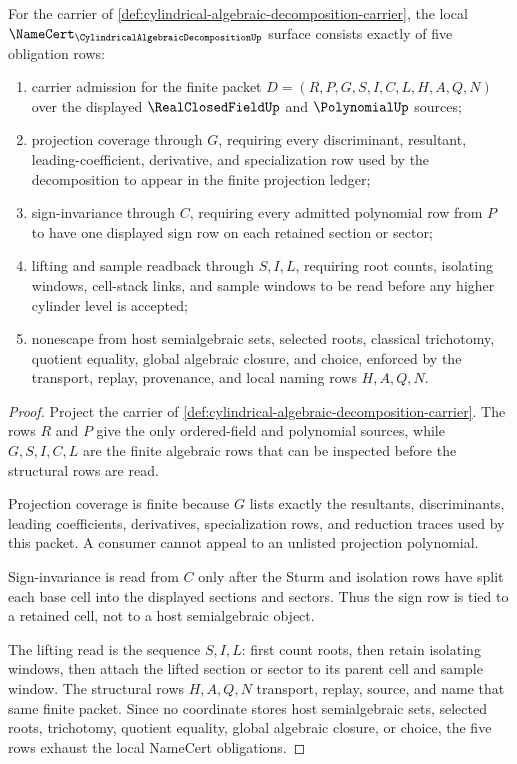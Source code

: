 \begin{theorem}
\label{thm:cylindrical-algebraic-decomposition-namecert-obligations}
For the carrier of \autoref{def:cylindrical-algebraic-decomposition-carrier}, the local $\NameCert_{\CylindricalAlgebraicDecompositionUp}$ surface consists exactly of five obligation rows:
\begin{enumerate}
\item carrier admission for the finite packet $D=(R,P,G,S,I,C,L,H,A,Q,N)$ over the displayed $\RealClosedFieldUp$ and $\PolynomialUp$ sources;
\item projection coverage through $G$, requiring every discriminant, resultant, leading-coefficient, derivative, and specialization row used by the decomposition to appear in the finite projection ledger;
\item sign-invariance through $C$, requiring every admitted polynomial row from $P$ to have one displayed sign row on each retained section or sector;
\item lifting and sample readback through $S,I,L$, requiring root counts, isolating windows, cell-stack links, and sample windows to be read before any higher cylinder level is accepted;
\item nonescape from host semialgebraic sets, selected roots, classical trichotomy, quotient equality, global algebraic closure, and choice, enforced by the transport, replay, provenance, and local naming rows $H,A,Q,N$.
\end{enumerate}
\end{theorem}
\begin{proof}
Project the carrier of \autoref{def:cylindrical-algebraic-decomposition-carrier}. The rows $R$ and $P$ give the only ordered-field and polynomial sources, while $G,S,I,C,L$ are the finite algebraic rows that can be inspected before the structural rows are read.

Projection coverage is finite because $G$ lists exactly the resultants, discriminants, leading coefficients, derivatives, specialization rows, and reduction traces used by this packet. A consumer cannot appeal to an unlisted projection polynomial.

Sign-invariance is read from $C$ only after the Sturm and isolation rows have split each base cell into the displayed sections and sectors. Thus the sign row is tied to a retained cell, not to a host semialgebraic object.

The lifting read is the sequence $S,I,L$: first count roots, then retain isolating windows, then attach the lifted section or sector to its parent cell and sample window. The structural rows $H,A,Q,N$ transport, replay, source, and name that same finite packet. Since no coordinate stores host semialgebraic sets, selected roots, trichotomy, quotient equality, global algebraic closure, or choice, the five rows exhaust the local NameCert obligations.
\end{proof}

